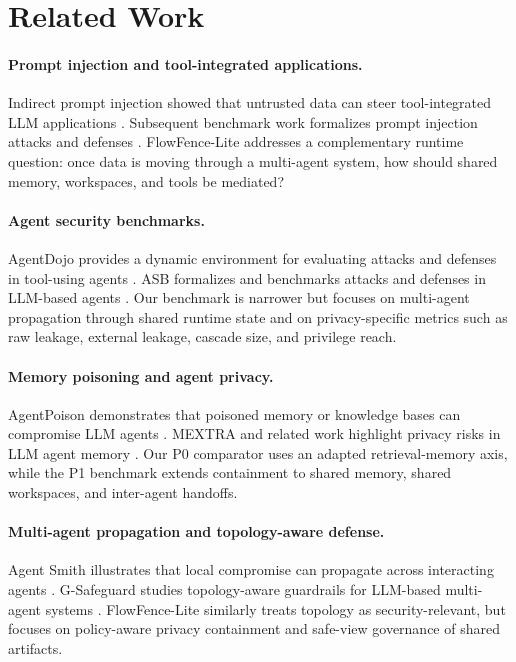 
\section{Related Work}

\paragraph{Prompt injection and tool-integrated applications.}
Indirect prompt injection showed that untrusted data can steer tool-integrated LLM applications \citep{greshake2023indirect}. Subsequent benchmark work formalizes prompt injection attacks and defenses \citep{liu2023promptinjection}. FlowFence-Lite addresses a complementary runtime question: once data is moving through a multi-agent system, how should shared memory, workspaces, and tools be mediated?

\paragraph{Agent security benchmarks.}
AgentDojo provides a dynamic environment for evaluating attacks and defenses in tool-using agents \citep{debenedetti2024agentdojo}. ASB formalizes and benchmarks attacks and defenses in LLM-based agents \citep{zhang2025asb}. Our benchmark is narrower but focuses on multi-agent propagation through shared runtime state and on privacy-specific metrics such as raw leakage, external leakage, cascade size, and privilege reach.

\paragraph{Memory poisoning and agent privacy.}
AgentPoison demonstrates that poisoned memory or knowledge bases can compromise LLM agents \citep{chen2024agentpoison}. MEXTRA and related work highlight privacy risks in LLM agent memory \citep{wang2025mextra}. Our P0 comparator uses an adapted retrieval-memory axis, while the P1 benchmark extends containment to shared memory, shared workspaces, and inter-agent handoffs.

\paragraph{Multi-agent propagation and topology-aware defense.}
Agent Smith illustrates that local compromise can propagate across interacting agents \citep{gu2024agentsmith}. G-Safeguard studies topology-aware guardrails for LLM-based multi-agent systems \citep{wang2025gsafeguard}. FlowFence-Lite similarly treats topology as security-relevant, but focuses on policy-aware privacy containment and safe-view governance of shared artifacts.

